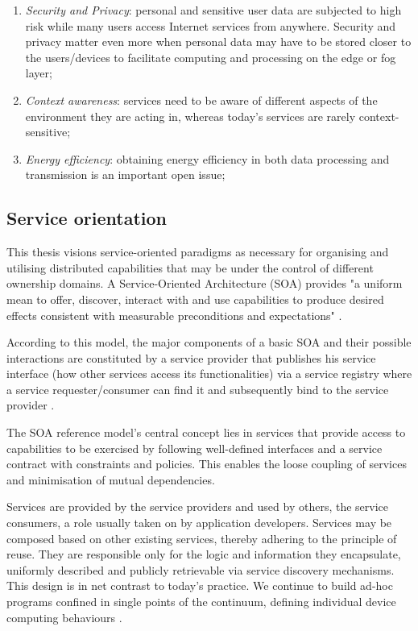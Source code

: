 \begin{enumerate}
    \item \emph{Security and Privacy}: personal and sensitive user data are subjected to high risk while many users access Internet services from anywhere. Security and privacy matter even more when personal data may have to be stored closer to the users/devices to facilitate computing and processing on the edge or fog layer;
    \item \emph{Context awareness}: services need to be aware of different aspects of the environment they are acting in, whereas today's services are rarely context-sensitive;
    \item \emph{Energy efficiency}: obtaining energy efficiency in both data processing and transmission is an important open issue;
\end{enumerate}

\subsection{Service orientation}

This thesis visions service-oriented paradigms as necessary for organising and utilising distributed capabilities that may be under the control of different ownership domains. A Service-Oriented Architecture (SOA) provides "a uniform mean to offer, discover, interact with and use capabilities to produce desired effects consistent with measurable preconditions and expectations" \cite{oasis}.

According to this model, the major components of a basic SOA and their possible interactions are constituted by a service provider that publishes his service interface (how other services access its functionalities) via a service registry where a service requester/consumer can find it and subsequently bind to the service provider \cite{iot-enterprise}.

The SOA reference model's central concept lies in services that provide access to capabilities to be exercised by following well-defined interfaces and a service contract with constraints and policies. This enables the loose coupling of services and minimisation of mutual dependencies.

Services are provided by the service providers and used by others, the service consumers, a role usually taken on by application developers. Services may be composed based on other existing services, thereby adhering to the principle of reuse. They are responsible only for the logic and information they encapsulate, uniformly described and publicly retrievable via service discovery mechanisms. This design is in net contrast to today's practice. We continue to build ad-hoc programs confined in single points of the continuum, defining individual device computing behaviours \cite{harnessing-continuum}.

